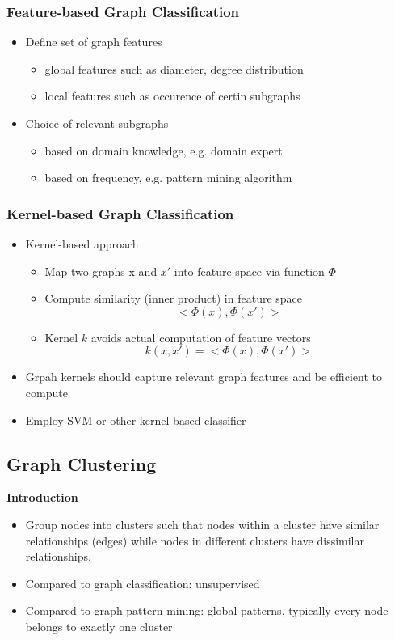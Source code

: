 \documentclass[../notes.tex]{subfiles}
\begin{document}
\subsubsection{Feature-based Graph Classification}
\begin{itemize}
  \item Define set of graph features
  \begin{itemize}
    \item global features such as diameter, degree distribution
    \item local features such as occurence of certin subgraphs 
  \end{itemize}

  \item Choice of relevant subgraphs
  \begin{itemize}
    \item based on domain knowledge, e.g. domain expert
    \item based on frequency, e.g. pattern mining algorithm
  \end{itemize}
\end{itemize}

\subsubsection{Kernel-based Graph Classification}
\begin{itemize}
  \item Kernel-based approach
  \begin{itemize}
    \item Map two graphs x and $x'$ into feature space via function $\Phi$
    \item Compute similarity (inner product) in feature space $$<\Phi(x), \Phi(x')>$$
    \item Kernel $k$ avoids actual computation of feature vectors $$k(x, x') = <\Phi(x), \Phi(x')>$$
  \end{itemize}

  \item Grpah kernels should capture relevant graph features and be efficient to compute
  \item Employ SVM or other kernel-based classifier
\end{itemize}


\subsection{Graph Clustering}
\textbf{Introduction}
\begin{itemize}
  \item Group nodes into clusters such that nodes within a cluster have similar relationships (edges) while nodes in different clusters have dissimilar relationships.
  \item Compared to graph classification: unsupervised
  \item Compared to graph pattern mining: global patterns, typically every node belongs to exactly one cluster
\end{itemize}
\end{document}
